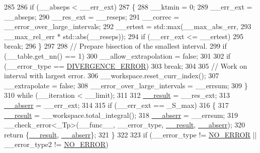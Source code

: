 \begin{DoxyCode}
285 
286           \textcolor{keywordflow}{if} (\_\_abseps < \_\_err\_ext)
287             \{
288               \_\_ktmin = 0;
289               \_\_err\_ext = \_\_abseps;
290               \_\_res\_ext = \_\_reseps;
291               \_\_correc = \_\_error\_over\_large\_intervals;
292               \_\_ertest = std::max(\_\_max\_abs\_err,
293                                   \_\_max\_rel\_err * std::abs(\_\_reseps));
294               \textcolor{keywordflow}{if} (\_\_err\_ext <= \_\_ertest)
295                 \textcolor{keywordflow}{break};
296             \}
297 
298           \textcolor{comment}{// Prepare bisection of the smallest interval.}
299           \textcolor{keywordflow}{if} (\_\_table.get\_nn() == 1)
300             \_\_allow\_extrapolation = \textcolor{keyword}{false};
301 
302           \textcolor{keywordflow}{if} (\_\_error\_type == \hyperlink{namespace____gnu__cxx_ad6c62dd86a596716cece6ac2d4cfd4b3a5a36b63b8fa7c921d9332c69416c2686}{DIVERGENCE\_ERROR})
303             \textcolor{keywordflow}{break};
304 
305           \textcolor{comment}{// Work on interval with largest error.}
306           \_\_workspace.reset\_curr\_index();
307           \_\_extrapolate = \textcolor{keyword}{false};
308           \_\_error\_over\_large\_intervals = \_\_errsum;
309         \}
310       \textcolor{keywordflow}{while} (\_\_iteration < \_\_limit);
311 
312       \hyperlink{namespace____gnu__cxx_a500ea9f53aeaecd8c2ae657503450578}{\_\_result} = \_\_res\_ext;
313       \hyperlink{namespace____gnu__cxx_a72f736cff127f1574e91a301de9e074b}{\_\_abserr} = \_\_err\_ext;
314 
315       \textcolor{keywordflow}{if} (\_\_err\_ext == \_S\_max)
316         \{
317           \hyperlink{namespace____gnu__cxx_a500ea9f53aeaecd8c2ae657503450578}{\_\_result} = \_\_workspace.total\_integral();
318           \hyperlink{namespace____gnu__cxx_a72f736cff127f1574e91a301de9e074b}{\_\_abserr} = \_\_errsum;
319           \_\_check\_error<\_Tp>(\_\_func\_\_, \_\_error\_type, \hyperlink{namespace____gnu__cxx_a500ea9f53aeaecd8c2ae657503450578}{\_\_result}, \hyperlink{namespace____gnu__cxx_a72f736cff127f1574e91a301de9e074b}{\_\_abserr});
320           \textcolor{keywordflow}{return} \{\hyperlink{namespace____gnu__cxx_a500ea9f53aeaecd8c2ae657503450578}{\_\_result}, \hyperlink{namespace____gnu__cxx_a72f736cff127f1574e91a301de9e074b}{\_\_abserr}\};
321         \}
322 
323       \textcolor{keywordflow}{if} (\_\_error\_type != \hyperlink{namespace____gnu__cxx_ad6c62dd86a596716cece6ac2d4cfd4b3ac31eecc280b10dec2efb4a2216ccc2e0}{NO\_ERROR} || \_\_error\_type2 != \hyperlink{namespace____gnu__cxx_ad6c62dd86a596716cece6ac2d4cfd4b3ac31eecc280b10dec2efb4a2216ccc2e0}{NO\_ERROR})

\end{DoxyCode}
